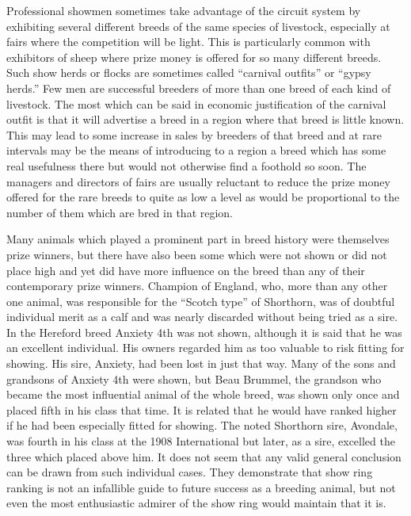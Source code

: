 Professional showmen sometimes take advantage of the circuit system
by exhibiting several different breeds of the same species of livestock,
especially at fairs where the competition will be light. This is
particularly common with exhibitors of sheep where prize money is
offered for so many different breeds. Such show herds or flocks are sometimes
called ``carnival outfits'' or ``gypsy herds.'' Few men are successful
breeders of more than one breed of each kind of livestock. The most
which can be said in economic justification of the carnival outfit is
that it will advertise a breed in a region where that breed is little
known. This may lead to some increase in sales by breeders of that
breed and at rare intervals may be the means of introducing to a region
a breed which has some real usefulness there but would not otherwise
find a foothold so soon. The managers and directors of fairs are
usually reluctant to reduce the prize money offered for the rare breeds
to quite as low a level as would be proportional to the number of them
which are bred in that region.

Many animals which played a prominent part in breed history were
themselves prize winners, but there have also been some which were not
shown or did not place high and yet did have more influence on the
breed than any of their contemporary prize winners. Champion of England,
who, more than any other one animal, was responsible for the
``Scotch type'' of Shorthorn, was of doubtful individual merit as a calf
and was nearly discarded without being tried as a sire. In the Hereford
breed Anxiety 4th was not shown, although it is said that he was an
excellent individual. His owners regarded him as too valuable to risk
fitting for showing. His sire, Anxiety, had been lost in just that way.
Many of the sons and grandsons of Anxiety 4th were shown, but Beau
Brummel, the grandson who became the most influential animal of the
whole breed, was shown only once and placed fifth in his class that time.
It is related that he would have ranked higher if he had been especially
fitted for showing. The noted Shorthorn sire, Avondale, was fourth in
his class at the 1908 International but later, as a sire, excelled the three
which placed above him. It does not seem that any valid general conclusion
can be drawn from such individual cases. They demonstrate
that show ring ranking is not an infallible guide to future success as a
breeding animal, but not even the most enthusiastic admirer of the
show ring would maintain that it is.

